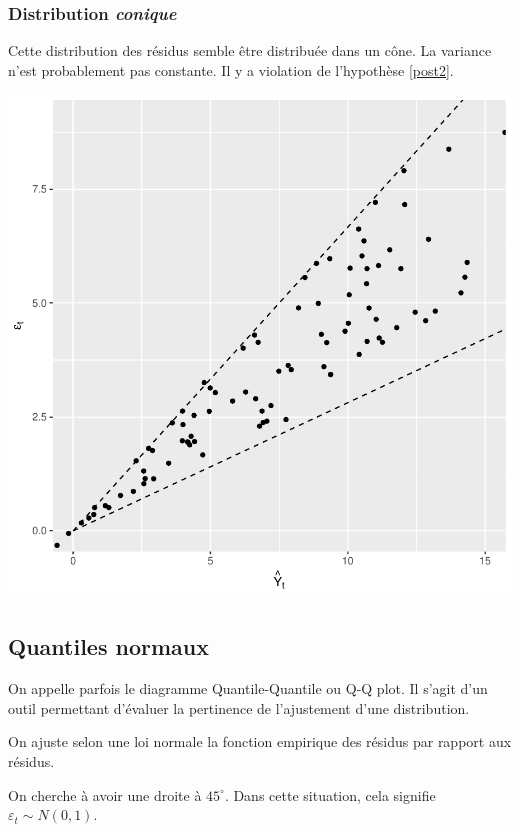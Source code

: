 \documentclass[11pt,french]{report}
\begin{document}
\subsubsection{Distribution \emph{conique}}
Cette distribution des résidus semble être distribuée dans un cône. La variance n'est probablement pas constante. Il y a violation de l'hypothèse \ref{post2}. 

\bigskip
\includegraphics{notes_de_cours-034}

\subsection{Quantiles normaux}
On appelle parfois le diagramme Quantile-Quantile ou Q-Q plot. Il s'agit d'un outil permettant d'évaluer la pertinence de l'ajustement d'une distribution. \newline

On ajuste selon une loi normale la fonction empirique des résidus par rapport aux résidus. \newline

On cherche à avoir une droite à $45^\circ$. Dans cette situation, cela signifie $\varepsilon_t \sim N(0,1)$.
\end{document}
